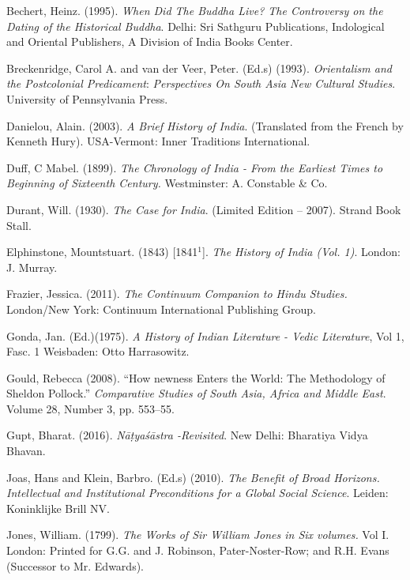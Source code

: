 \begin{thebibliography}{99}
\itemsep=1pt
 Bechert, Heinz. (1995). \textit{When Did The Buddha Live? The Controversy on the Dating of the Historical Buddha}. Delhi: Sri Sathguru Publications, Indological and Oriental Publishers, A Division of India Books Center.

  Breckenridge, Carol A. and van der Veer, Peter. (Ed.s) (1993). \textit{Orientalism and the Postcolonial Predicament}: \textit{Perspectives On South Asia New Cultural Studies}. University of Pennsylvania Press.

  Danielou, Alain. (2003). \textit{A Brief History of India}. (Translated from the French by Kenneth Hury). USA-Vermont: Inner Traditions International.

  Duff, C Mabel. (1899). \textit{The Chronology of India - From the Earliest Times to Beginning of Sixteenth Century.} Westminster: A. Constable \& Co.

  Durant, Will. (1930). \textit{The Case for India}. (Limited Edition – 2007). Strand Book Stall.

  Elphinstone, Mountstuart. (1843) [1841$^{1}$]. \textit{The History of India (Vol. 1)}. London: J. Murray.

  Frazier, Jessica. (2011). \textit{The Continuum Companion to Hindu Studies.} London/New York: Continuum International Publishing Group.

  Gonda, Jan. (Ed.)(1975). \textit{A History of Indian Literature - Vedic Literature}, Vol 1, Fasc. 1 Weisbaden: Otto Harrasowitz.

  Gould, Rebecca (2008). “How newness Enters the World: The Methodology of Sheldon Pollock.” \textit{Comparative Studies of South Asia, Africa and Middle East}. Volume 28, Number 3, pp. 553--55.

  Gupt, Bharat. (2016). \textit{Nāṭyaśāstra -Revisited}. New Delhi: Bharatiya Vidya Bhavan.

  Joas, Hans and Klein, Barbro. (Ed.s) (2010). \textit{The Benefit of Broad Horizons. Intellectual and Institutional Preconditions for a Global Social Science}. Leiden: Koninklijke Brill NV.

  Jones, William. (1799). \textit{ The Works of Sir William Jones in Six volumes.} Vol I. London: Printed for G.G. and J. Robinson, Pater-Noster-Row; and R.H. Evans (Successor to Mr. Edwards).


\end{thebibliography}
